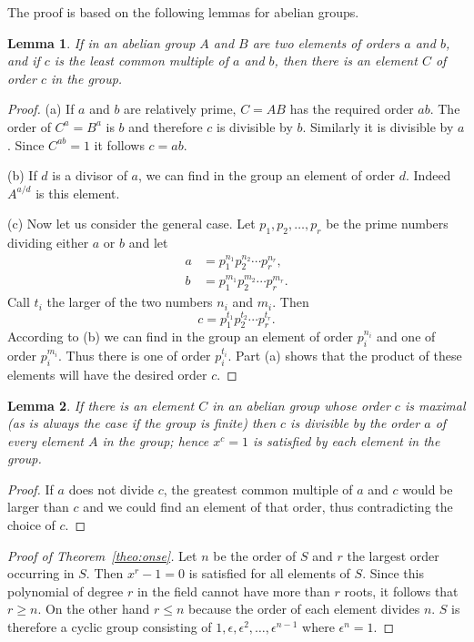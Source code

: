 \documentclass[10pt,leqno]{article}
\newtheorem{lemm}{Lemma}
\theoremstyle{definition}
\begin{document}
The proof is based on the following lemmas for abelian groups.


\begin{lemm}
\label{lemm:on}
If in an abelian group $A$ and $B$ are two elements of orders $a$ and $b$, and if $c$ is the least common multiple of $a$ and $b$, then there is an element $C$ of order $c$ in the group.
\end{lemm}

\begin{proof}
(a) If $a$ and $b$ are relatively prime, $C = AB$ has the required order $ab$.
The order of $C^a = B^a$ is $b$ and therefore $c$ is divisible by $b$.
Similarly it is divisible by $a$.
Since $C^{ab} = 1$ it follows $c = ab$.

(b) If $d$ is a divisor of $a$, we can find in the group an element of order $d$.
Indeed $A^{a/d}$ is this element.

(c) Now let us consider the general case.
Let $p_1, p_2, \ldots, p_r$ be the prime numbers dividing either $a$ or $b$ and let
\begin{align*}
a &= p_1^{n_1} p_2^{n_2} \cdots p_r^{n_r},
\\
b &= p_1^{m_1} p_2^{m_2} \cdots p_r^{m_r}.
\end{align*}
Call $t_i$ the larger of the two numbers $n_i$ and $m_i$.
Then
\[
c = p_1^{t_1} p_2^{t_2} \cdots p_r^{t_r}.
\]
According to (b) we can find in the group an element of order $p_i^{n_i}$ and one of order $p_i^{m_i}$.
Thus there is one of order $p_i^{t_i}$.
Part (a) shows that the product of these elements will have the desired order $c$.
\end{proof}


\begin{lemm}
\label{lemm:tw}
If there is an element $C$ in an abelian group whose order $c$ is maximal (as is always the case if the group is finite) then $c$ is divisible by the order $a$ of every element $A$ in the group; hence $x^c = 1$ is satisfied by each element in the group.
\end{lemm}

\begin{proof}
If $a$ does not divide $c$, the greatest common multiple of $a$ and $c$ would be larger than $c$ and we could find an element of that order, thus contradicting the choice of $c$.
\end{proof}


\begin{proof}[Proof of Theorem~\ref{theo:onse}]
Let $n$ be the order of $S$ and $r$ the largest order occurring in $S$.
Then $x^r - 1 = 0$ is satisfied for all elements of $S$.
Since this polynomial of degree $r$ in the field cannot have more than $r$ roots, it follows that $r \geq n$.
On the other hand $r \leq n$ because the order of each element divides $n$.
$S$ is therefore a cyclic group consisting of $1, \epsilon, \epsilon^2, \ldots, \epsilon^{n-1}$ where $\epsilon^n = 1$.
\end{proof}
\end{document}
